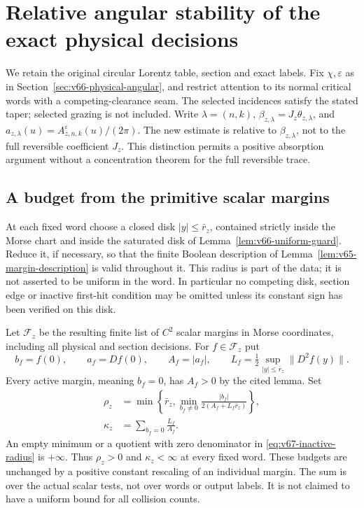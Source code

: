 \section{Relative angular stability of the exact physical decisions}
\label{sec:v67-angular-stability}
We retain the original circular Lorentz table, section and exact labels.
Fix $\chi,\varepsilon$ as in Section~\ref{sec:v66-physical-angular}, and
restrict attention to its normal critical words with a competing-clearance
seam. The selected incidences satisfy the stated taper; selected grazing
is not included. Write $\lambda=(n,k)$, $\beta_{z,\lambda}=J_z\theta_{z,\lambda}$,
and $a_{z,\lambda}(u)=A_{z,n,k}^{\varepsilon}(u)/(2\pi)$.
The new estimate is relative to $\beta_{z,\lambda}$, not to the full
reversible coefficient $J_z$. This distinction permits a positive
absorption argument without a concentration theorem for the full
reversible trace.

\subsection{A budget from the primitive scalar margins}
At each fixed word choose a closed disk $|y|\le\bar r_z$, contained
strictly inside the Morse chart and inside the saturated disk of
Lemma~\ref{lem:v66-uniform-guard}. Reduce it, if necessary, so that the
finite Boolean description of Lemma~\ref{lem:v65-margin-description}
is valid throughout it. This radius is part of the data; it is not
asserted to be uniform in the word. In particular no competing disk,
section edge or inactive first-hit condition may be omitted unless its
constant sign has been verified on this disk.

Let $\mathscr F_z$ be the resulting finite list of $C^2$ scalar margins
in Morse coordinates, including all physical and section decisions.
For $f\in\mathscr F_z$ put
\[
 b_f=f(0),\qquad a_f=Df(0),\qquad A_f=|a_f|,\qquad
 L_f=\tfrac12\sup_{|y|\le\bar r_z}\|D^2f(y)\|.
\]
Every active margin, meaning $b_f=0$, has $A_f>0$ by the cited lemma.
Set
\begin{align}
 \rho_z&=\min\left\{\bar r_z,
       \min_{b_f\ne0}\frac{|b_f|}{2(A_f+L_f\bar r_z)}\right\},
                                                        \label{eq:v67-inactive-radius}\\
 \kappa_z&=\sum_{b_f=0}\frac{L_f}{A_f}.   \label{eq:v67-active-budget}
\end{align}
An empty minimum or a quotient with zero denominator in
\eqref{eq:v67-inactive-radius} is $+\infty$. Thus $\rho_z>0$ and
$\kappa_z<\infty$ at every fixed word. These budgets are unchanged
by a positive constant rescaling of an individual margin. The sum is
over the actual scalar tests, not over words or output labels. It is
not claimed to have a uniform bound for all collision counts.

